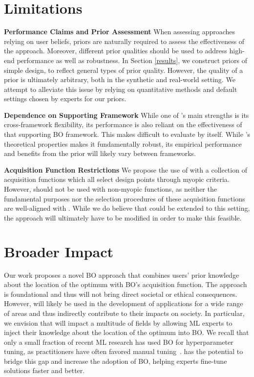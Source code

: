 \section{Limitations} \label{sec:limitations}
 \textbf{Performance Claims and Prior Assessment} \quad
 When assessing approaches relying on user beliefs, priors are naturally required to assess the effectiveness of the approach. Moreover, different prior qualities should be used to address high-end performance as well as robustness. In Section \ref{results}, we construct priors of simple design, to reflect general types of prior quality. However, the quality of a prior is ultimately arbitrary, both in the synthetic and real-world setting. We attempt to alleviate this issue by relying on quantitative methods and default settings chosen by experts for our priors.
 
 \textbf{Dependence on Supporting Framework}\quad
While one of \method's main strengths is its cross-framework flexibility, its performance is also reliant on the effectiveness of that supporting BO framework. This makes \method difficult to evaluate by itself. While \method's theoretical properties makes it fundamentally robust, its empirical performance and benefits from the prior will likely vary between frameworks. 
 
  \textbf{Acquisition Function Restrictions}\quad
We propose the use of \method with a collection of acquisition functions which all select design points through myopic criteria. However, \method should not be used with non-myopic functions, as neither the fundamental purposes nor the selection procedures of these acquisition functions are well-aligned with \method. While we do believe that \method could be extended to this setting, the approach will ultimately have to be modified in order to make this feasible.

\section{Broader Impact} \label{sec:impact}

Our work proposes a novel BO approach that combines users' prior knowledge about the location of the optimum with BO's acquisition function. The approach is foundational and thus will not bring direct societal or ethical consequences. However, \method will likely be used in the development of applications for a wide range of areas and thus indirectly contribute to their impacts on society. In particular, we envision that \method will impact a multitude of fields by allowing ML experts to inject their knowledge about the location of the optimum into BO. We recall that only a small fraction of recent ML research has used BO for hyperparameter tuning, as practitioners have often favored manual tuning~\cite{bouthillier:survey}. \method has the potential to bridge this gap and increase the adoption of BO, helping experts fine-tune solutions faster and better. 

